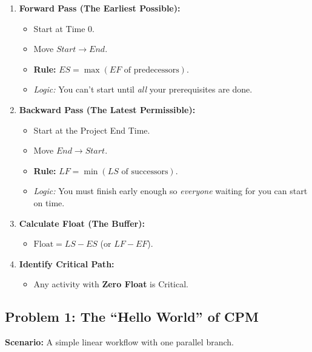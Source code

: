 \documentclass[
  letterpaper,
  DIV=11,
  numbers=noendperiod]{scrreprt}
\providecommand{\tightlist}{%
  \setlength{\itemsep}{0pt}\setlength{\parskip}{0pt}}
\begin{document}
\begin{enumerate}
\def\labelenumi{\arabic{enumi}.}
\item
  \textbf{Forward Pass (The Earliest Possible):}

  \begin{itemize}
  \tightlist
  \item
    Start at Time 0.
  \item
    Move \(Start \to End\).
  \item
    \textbf{Rule:} \(ES = \max(EF \text{ of predecessors})\).
  \item
    \emph{Logic:} You can't start until \emph{all} your prerequisites
    are done.
  \end{itemize}
\item
  \textbf{Backward Pass (The Latest Permissible):}

  \begin{itemize}
  \tightlist
  \item
    Start at the Project End Time.
  \item
    Move \(End \to Start\).
  \item
    \textbf{Rule:} \(LF = \min(LS \text{ of successors})\).
  \item
    \emph{Logic:} You must finish early enough so \emph{everyone}
    waiting for you can start on time.
  \end{itemize}
\item
  \textbf{Calculate Float (The Buffer):}

  \begin{itemize}
  \tightlist
  \item
    \(\text{Float} = LS - ES\) (or \(LF - EF\)).
  \end{itemize}
\item
  \textbf{Identify Critical Path:}

  \begin{itemize}
  \tightlist
  \item
    Any activity with \textbf{Zero Float} is Critical.
  \end{itemize}
\end{enumerate}

\subsection{Problem 1: The ``Hello World'' of
CPM}\label{problem-1-the-hello-world-of-cpm}

\textbf{Scenario:} A simple linear workflow with one parallel branch.
\end{document}
